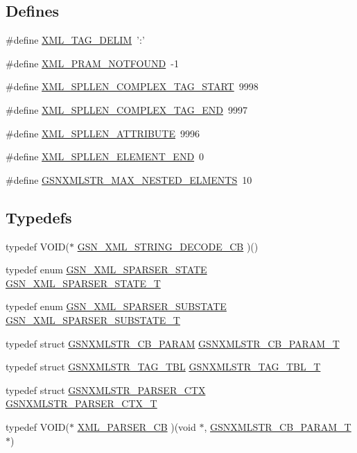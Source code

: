 \subsection*{Defines}
\begin{DoxyCompactItemize}
\item 
\#define \hyperlink{a00617_a09493df9ef1c8c1efcd140f312c1339a}{XML\_\-TAG\_\-DELIM}~':'
\item 
\#define \hyperlink{a00617_ae022c7443fa057eab9332be3bcf30ee1}{XML\_\-PRAM\_\-NOTFOUND}~-\/1
\item 
\#define \hyperlink{a00617_a0bf4ba66f68d29a25220741fef120715}{XML\_\-SPLLEN\_\-COMPLEX\_\-TAG\_\-START}~9998
\item 
\#define \hyperlink{a00617_a0db347e2f3ff29be9ed8f7c0a31dfdfe}{XML\_\-SPLLEN\_\-COMPLEX\_\-TAG\_\-END}~9997
\item 
\#define \hyperlink{a00617_ac9cfa337a705cb1ebeaa1128f5444e04}{XML\_\-SPLLEN\_\-ATTRIBUTE}~9996
\item 
\#define \hyperlink{a00617_ad6b2d5ba3c774ca9a68e2c1a80c1a6f1}{XML\_\-SPLLEN\_\-ELEMENT\_\-END}~0
\item 
\#define \hyperlink{a00617_a43044dd9d746fc224bae3fb539cfb277}{GSNXMLSTR\_\-MAX\_\-NESTED\_\-ELMENTS}~10
\end{DoxyCompactItemize}
\subsection*{Typedefs}
\begin{DoxyCompactItemize}
\item 
typedef VOID($\ast$ \hyperlink{a00617_a3c1986da00f01da491bb75cd8b92638f}{GSN\_\-XML\_\-STRING\_\-DECODE\_\-CB} )()
\item 
typedef enum \hyperlink{a00617_a933b08dd0c11d03cdb7673574f376355}{GSN\_\-XML\_\-SPARSER\_\-STATE} \hyperlink{a00617_a045b855de28d8d53ac3eea33744c4373}{GSN\_\-XML\_\-SPARSER\_\-STATE\_\-T}
\item 
typedef enum \hyperlink{a00617_aef610642a09e23ef6afbf0a6cbb981a1}{GSN\_\-XML\_\-SPARSER\_\-SUBSTATE} \hyperlink{a00617_ac9440bea1b7765eea3dee99fd963f32b}{GSN\_\-XML\_\-SPARSER\_\-SUBSTATE\_\-T}
\item 
typedef struct \hyperlink{a00443}{GSNXMLSTR\_\-CB\_\-PARAM} \hyperlink{a00617_ada7e23a9d8fd32114ec83e0e38bbb3b0}{GSNXMLSTR\_\-CB\_\-PARAM\_\-T}
\item 
typedef struct \hyperlink{a00445}{GSNXMLSTR\_\-TAG\_\-TBL} \hyperlink{a00617_a18cff694b8d047609a93d6c8a649252f}{GSNXMLSTR\_\-TAG\_\-TBL\_\-T}
\item 
typedef struct \hyperlink{a00444}{GSNXMLSTR\_\-PARSER\_\-CTX} \hyperlink{a00617_a64ce49bd32531a998af089593a5bd708}{GSNXMLSTR\_\-PARSER\_\-CTX\_\-T}
\item 
typedef VOID($\ast$ \hyperlink{a00617_ac0dc2fec904f158bdcee4a2af8dd1a69}{XML\_\-PARSER\_\-CB} )(void $\ast$, \hyperlink{a00443}{GSNXMLSTR\_\-CB\_\-PARAM\_\-T} $\ast$)
\end{DoxyCompactItemize}
